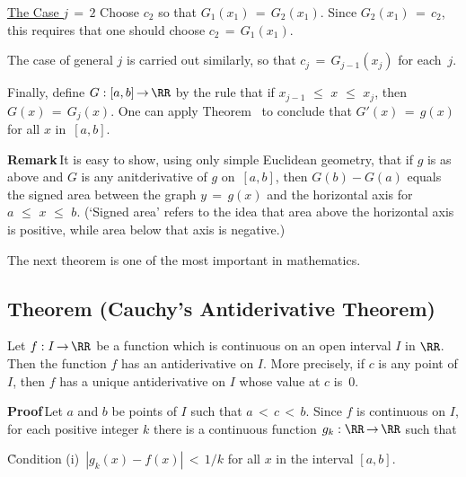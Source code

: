 {        \underline{The Case $j \,=\, 2$} Choose $c_{2}$ so that $G_{1}(x_{1}) \,=\, G_{2}(x_{1})$.
    Since $G_{2}(x_{1}) \,=\, c_{2}$, this requires that one should choose $c_{2} \,=\, G_{1}(x_{1})$.

        The case of general $j$ is carried out similarly, so that $c_{j} \,=\, G_{j-1}(x_{j})$ for each~$j$.

        Finally, define $G:[a,b] \,{\rightarrow}\, {\RR}$ by the rule that if $x_{j-1}\,\,{\leq}\,\,x\,\,{\leq}\,\,x_{j}$, then $G(x) \,=\, G_{j}(x)$.
    One can apply Theorem~ to conclude that $G'(x) \,=\, g(x)$ for all $x$ in~$[a,b]$. \Q

\V

        {\bf Remark}\,It is easy to show, using only simple Euclidean geometry, that if $g$ is as above and $G$ is any anitderivative of $g$ on~$[a,b]$,
    then $G(b) - G(a)$ equals the signed area between the graph $y \,=\, g(x)$ and the horizontal axis for $a\,\,{\leq}\,\,x\,\,{\leq}\,\,b$.
    (`Signed area' refers to the idea that area above the horizontal axis is positive, while area below that axis is negative.)

\VV

        The next theorem is one of the most important in mathematics. 

\VV

             \subsection{\small{\bf Theorem} (Cauchy's Antiderivative Theorem)}
                         \label{ThmE45.125B}

\V

        Let $f:I \,{\rightarrow}\, {\RR}$ be a function which is continuous on an open interval $I$ in ${\RR}$.
    Then the function $f$ has an antiderivative on $I$. More precisely, if $c$ is any point of $I$,
    then $f$ has a unique antiderivative on $I$ whose value at $c$ is~$0$.

\V

        {\bf Proof}\,Let $a$ and $b$ be points of $I$ such that $a\,<\,c\,<\,b$.
    Since $f$ is continuous on $I$, for each positive integer $k$ there is a continuous function $g_{k}:{\RR} \,{\rightarrow}\, {\RR}$ such that

\VA

        \h Condition (i)\, $|g_{k}(x) - f(x)|\,<\,1/k$ for all $x$ in the interval $[a,b]$.

}
